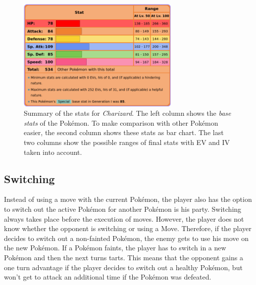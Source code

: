 \begin{figure}[h]
	\centering
	\includegraphics[width=0.7\textwidth]{images/charizard-stats.png}
	\caption{Summary of the stats for \textit{Charizard}. The left column shows the
	\textit{base stats} of the Pokémon. To make comparison with other Pokémon easier, 
	the second column shows these stats as bar chart. The last two columns show the
	possible ranges of final stats with \ac{EV} and \ac{IV} taken into account.}
	\label{fig:charizard-stats}
\end{figure}

\subsection{Switching}
\label{sec:switching}
Instead of using a move with the current Pokémon, the player also has the option to switch out the 
active Pokémon for another Pokémon is his party. Switching always takes place before the execution of moves.
However, the player does not know whether the opponent is switching or using a Move. Therefore, if the 
player decides to switch out a non-fainted Pokémon, the enemy gets to use his move on the new Pokémon.
If a Pokémon faints, the player has to switch in a new Pokémon and then the next turns tarts. This means
that the opponent gains a one turn advantage if the player decides to switch out a healthy Pokémon, but
won't get to attack an additional time if the Pokémon was defeated.  

